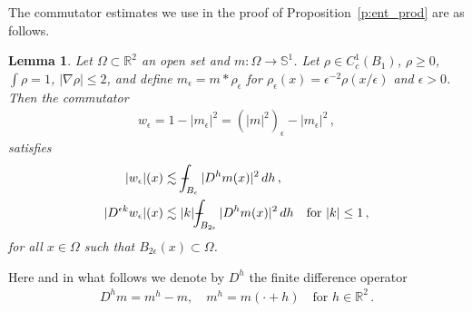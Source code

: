 \documentclass[fleqn
]{article}
\numberwithin{equation}{section}
\newcommand{\R}{{\mathbb R}}
\newcommand{\e}{\epsilon}
\def\Xint#1{\mathchoice
	{\XXint\displaystyle\textstyle{#1}}%
	{\XXint\textstyle\scriptstyle{#1}}%
	{\XXint\scriptstyle\scriptscriptstyle{#1}}%
	{\XXint\scriptscriptstyle\scriptscriptstyle{#1}}%
	\!\int}
\def\XXint#1#2#3{{\setbox0=\hbox{$#1{#2#3}{\int}$}
		\vcenter{\hbox{$#2#3$}}\kern-.5\wd0}}
\newtheorem{lem}[thm]{Lemma}
\theoremstyle{definition}
\begin{document}
The commutator estimates we use in the proof of Proposition~\ref{p:ent_prod} are as follows.

\begin{lem}\label{l:commut}
Let $\Omega\subset\R^2$ an open set and $m\colon\Omega\to\mathbb S^1$.
Let $\rho\in C_c^1(B_1)$, $\rho\geq 0$, $\int\rho=1$, $|\nabla\rho|\leq 2$, and define $m_\e=m*\rho_\e$ for $\rho_\e(x)=\e^{-2}\rho(x/\e)$ and $\e>0$.
Then the commutator 
\begin{align*}
w_\e =1-|m_\e|^2 = (|m|^2 )_\e -|m_\e|^2\,,
\end{align*}
satisfies
\begin{align*}
|w_\e|(x)
&
\lesssim
\Xint{-}_{B_{\e}}|D^h m(x)|^2 
\, dh\,,
\\
|D^{\e k} w_\e|(x)
&
\lesssim |k| 
\Xint{-}_{B_{2\e}}
|D^h m(x)|^2
\, dh\quad \text{for }|k|\leq 1\,,
\end{align*}
for all $x\in\Omega$ such that $B_{2\e}(x)\subset\Omega$.
\end{lem}

Here and in what follows we denote by $D^h$ the finite difference operator
\begin{align*}
D^h m =m^h - m,\quad m^h =m(\cdot +h)\quad\text{for }h\in\R^2\,.
\end{align*}
\end{document}
